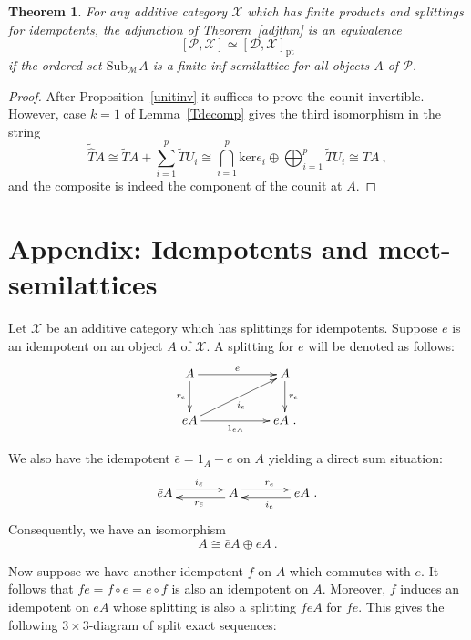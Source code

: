 \documentclass[a4paper,12pt,reqno]{amsart}
\newtheorem{theorem}{Theorem}[section] %
\theoremstyle{definition}
\theoremstyle{fact}
\theoremstyle{genquest}
\theoremstyle{step}
\def\CD{{\mathscr D}}
\def\CM{{\mathscr M}}
\def\CP{{\mathscr P}}
\def\CX{{\mathscr X}}
\begin{document}
\begin{theorem}
For any additive category $\CX$ which has finite products and splittings for idempotents, 
the adjunction of Theorem~\ref{adjthm} is an equivalence 
$$[\CP,\CX] \simeq [\CD,\CX]_{\mathrm{pt}}$$
if the ordered set $\mathrm{Sub}_{\CM}A$ is a finite inf-semilattice for all objects $A$ of $\CP$.
\end{theorem}
\begin{proof}
After Proposition~\ref{unitinv} it suffices to prove the counit invertible.
However, case $k=1$ of Lemma~\ref{Tdecomp} gives the third isomorphism in the string
$$\widetilde{\widehat{T}}A \cong \widetilde{T}A + \sum_{i=1}^p{\widetilde{T}U_i} \cong \bigcap_{i=1}^p{\mathrm{ker }e_i} \oplus \bigoplus_{i=1}^p{\widetilde{T}U_i} \cong TA \ ,$$
and the composite is indeed the component of the counit at $A$.  
\end{proof}

\section{Appendix: Idempotents and meet-semilattices}\label{Append}

Let $\CX$ be an additive category which has splittings for idempotents.
Suppose $e$ is an idempotent on an object $A$ of $\CX$. A splitting for $e$ will be denoted as
follows:
\begin{equation}
\begin{aligned}
\xymatrix{
A \ar[rr]^-{e} \ar[d]_-{r_e} && A \ar[d]^-{r_e} \\
eA \ar[rr]_-{1_{eA}} \ar[urr]_{i_e} && eA \ .}
\end{aligned}
\end{equation}

We also have the idempotent $\bar{e} = 1_A-e$ on $A$ yielding a direct sum situation:
\begin{equation}
 \xymatrix @C+5mm{
 \bar{e}A \ar @<3pt> [r]^{i_{\bar{e}}}  
 & A \ar @<3pt> [r]^{r_e} \ar @<3pt>[l]^{r_{\bar{e}}}
 & eA \ar @<3pt> [l]^{i_e} \ .}
\end{equation}
Consequently, we have an isomorphism
$$A \cong  \bar{e}A \oplus eA \ .$$ 

Now suppose we have another idempotent $f$ on $A$ which commutes with $e$.
It follows that $fe = f \circ e = e\circ f$ is also an idempotent on $A$. Moreover,
$f$ induces an idempotent on $eA$ whose splitting is also a splitting $feA$ for $fe$. 
This gives the following $3\times 3$-diagram of split exact sequences:
\end{document}

